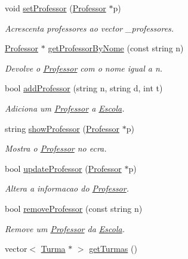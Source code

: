 \begin{DoxyCompactItemize}
void \hyperlink{class_escola_a69bc6d8eb743a508d2b805285fd59e35}{set\-Professor} (\hyperlink{class_professor}{Professor} $\ast$p)
\begin{DoxyCompactList}\small\item\em Acrescenta professores ao vector \-\_\-professores. \end{DoxyCompactList}\item 
\hyperlink{class_professor}{Professor} $\ast$ \hyperlink{class_escola_a1f0dba75b82a3aec3cdaccafec4350c3}{get\-Professor\-By\-Nome} (const string n)
\begin{DoxyCompactList}\small\item\em Devolve o \hyperlink{class_professor}{Professor} com o nome igual a n. \end{DoxyCompactList}\item 
bool \hyperlink{class_escola_a9cb288aece2339850bd18eaf1614f8b9}{add\-Professor} (string n, string d, int t)
\begin{DoxyCompactList}\small\item\em Adiciona um \hyperlink{class_professor}{Professor} a \hyperlink{class_escola}{Escola}. \end{DoxyCompactList}\item 
string \hyperlink{class_escola_addc6cd7b85c6fdba76dd536c580c16c8}{show\-Professor} (\hyperlink{class_professor}{Professor} $\ast$p)
\begin{DoxyCompactList}\small\item\em Mostra o \hyperlink{class_professor}{Professor} no ecra. \end{DoxyCompactList}\item 
bool \hyperlink{class_escola_a409612d09d981eb7e6e3a532080d7aed}{update\-Professor} (\hyperlink{class_professor}{Professor} $\ast$p)
\begin{DoxyCompactList}\small\item\em Altera a informacao do \hyperlink{class_professor}{Professor}. \end{DoxyCompactList}\item 
bool \hyperlink{class_escola_ab88ff73f646f14380fdbb5a55bc49882}{remove\-Professor} (const string n)
\begin{DoxyCompactList}\small\item\em Remove um \hyperlink{class_professor}{Professor} da \hyperlink{class_escola}{Escola}. \end{DoxyCompactList}\item 
vector$<$ \hyperlink{class_turma}{Turma} $\ast$ $>$ \hyperlink{class_escola_acee757e16892f33820b22a7d7749d97d}{get\-Turmas} ()

\end{DoxyCompactItemize}

